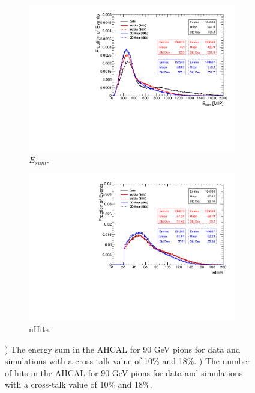 \begin{figure}[htbp!]
  \centering
  \begin{subfigure}[t]{0.49\textwidth}
    \includegraphics[width=1.\linewidth]{chap5/fig_AHCAL_Timing/Pions/Comparison_EnergySum_Xtalk_pions90GeV.pdf}
    \caption{$E_{sum}$.} \label{fig:pi90Evis}
  \end{subfigure}
  \hfill
  \begin{subfigure}[t]{0.49\textwidth}
    \includegraphics[width=1.\linewidth]{chap5/fig_AHCAL_Timing/Pions/Comparison_nHits_Xtalk_pions90GeV.pdf}
    \caption{nHits.} \label{fig:pi90nHits}
  \end{subfigure}
  \caption{) The energy sum in the AHCAL for 90 GeV pions for data and simulations with a cross-talk value of 10\% and 18\%. ) The number of hits in the AHCAL for 90 GeV pions for data and simulations with a cross-talk value of 10\% and 18\%.}
  \label{fig:pi90Val}
\end{figure}

